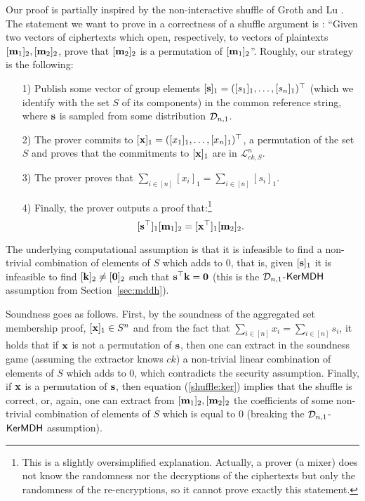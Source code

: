Our proof is partially inspired by the non-interactive shuffle of Groth and Lu \cite{AC:GroLu07}. The statement we want to prove in a correctness of a shuffle argument is : ``Given two vectors of ciphertexts which open, respectively, to vectors of plaintexts $[\mathbf{m}_1]_2, [\mathbf{m}_2]_2$, prove that 
 $[\mathbf{m}_2]_2$ is a permutation of $[\mathbf{m}_1]_2$''.  Roughly, our strategy is the following:  
\begin{itemize}
\item[1)] Publish some vector of group elements $[\mathbf{s}]_1 =([s_1]_1,\ldots,[s_n]_1)^\top$ (which we identify with the set $S$ of its components) in the common reference string, where $\mathbf{s}$ is sampled from some distribution $\mathcal{D}_{n,1}$.
\item[2)] The prover commits to $[\mathbf{x}]_1=([x_1]_1,\ldots,[x_n]_1)^\top$, a permutation of the set $S$ and proves that the commitments to $[\mathbf{x}]_1$ are in $\mathcal{L}^{n}_{ck,S}$.
\item[3)] The prover proves that $\sum_{i \in [n]} [x_i]_1 =\sum_{i \in [n]} [s_i]_1$.
\item[4)] Finally, the prover outputs a proof that:\footnote{This is a slightly oversimplified explanation. 
Actually, a prover (a mixer) does not know the randomness nor the decryptions of the ciphertexts but only the randomness of the re-encryptions, so it cannot prove exactly this statement.} 
\begin{equation}\label{shuffle:ker}[\mathbf{s}^{\top}]_1 [\mathbf{m}_1]_2 =[\mathbf{x}^{\top}]_1 [\mathbf{m}_2]_2.
\end{equation}
\end{itemize}
The underlying computational assumption is that it is infeasible to find a non-trivial combination of elements of $S$ which adds to $0$, that is, given $[\mathbf{s}]_1$ it is infeasible to find $[\mathbf{k}]_2 \neq [\mathbf{0}]_2$ such that
$\mathbf{s}^{\top} \mathbf{k}=\mathbf{0}$ (this is the $\mathcal{D}_{n,1}$-$\mathsf{KerMDH}$ assumption from Section~\ref{sec:mddh}). 

Soundness goes as follows. First, by the soundness of the aggregated set membership proof, $[\mathbf{x}]_1 \in S^{n}$ and from the fact that 
 $\sum_{i \in [n]} x_i =\sum_{i \in [n]} s_i$, it holds that if 
 $\mathbf{x}$ is not a permutation of $\mathbf{s}$, then one can extract in the soundness game (assuming the extractor knows $ck$) a non-trivial linear combination of elements of $S$ which adds to $0$, which contradicts the security assumption. 
Finally, if $\mathbf{x}$ is a permutation of $\mathbf{s}$,  then equation (\ref{shuffle:ker}) implies that the shuffle is correct, or, again, 
one can extract from   $[\mathbf{m}_1]_2,[\mathbf{m}_2]_2$ the coefficients of some non-trivial combination of elements of $S$ which is equal to $0$ (breaking the $\mathcal{D}_{n,1}$-$\mathsf{KerMDH}$ assumption). 

